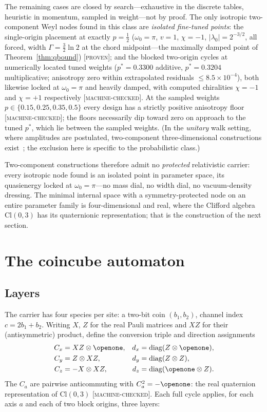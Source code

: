 \documentclass[aps,prd,twocolumn,superscriptaddress,nofootinbib,floatfix]{revtex4-2}
\newcommand{\evP}{\textnormal{\textsc{[proven]}}}
\newcommand{\evM}{\textnormal{\textsc{[machine-checked]}}}
\begin{document}
The remaining cases are closed by search---exhaustive in the discrete
tables, heuristic in momentum, sampled in weight---not by proof.
The only isotropic two-component Weyl nodes found in this class are
\emph{isolated fine-tuned points}: the single-origin placement at
exactly $p=\tfrac12$
($\omega_0=\pi$, $v=1$, $\chi=-1$, $|\lambda_0|=2^{-3/2}$, all forced,
width $\Gamma=\tfrac32\ln2$ at the chord midpoint---the maximally
damped point of Theorem~\ref{thm:qbound}) \evP{}; and the blocked
two-origin cycles at numerically located tuned weights ($p^*=0.3300$
additive, $p^*=0.3204$ multiplicative; anisotropy zero within
extrapolated residuals $\le8.5\times10^{-4}$), both likewise locked at
$\omega_0=\pi$ and heavily damped, with computed chiralities $\chi=-1$
and $\chi=+1$ respectively \evM{}. At the sampled weights
$p\in\{0.15,0.25,0.35,0.5\}$ every design has a strictly positive
anisotropy floor \evM{}; the floors necessarily dip toward zero on
approach to the tuned $p^*$, which lie between the sampled weights.
(In the \emph{unitary} walk setting, where amplitudes are postulated,
two-component three-dimensional constructions
exist~\cite{Chandrashekar,DArianoErba}; the exclusion here is specific
to the probabilistic class.)

Two-component constructions therefore admit no \emph{protected}
relativistic carrier: every isotropic node found is an isolated point in
parameter space, its quasienergy locked at $\omega_0=\pi$---no mass dial,
no width dial, no vacuum-density dressing. The minimal internal space
with a symmetry-protected node on an entire parameter family is
four-dimensional and real, where the Clifford algebra $\mathrm{Cl}(0,3)$
has its quaternionic representation; that is the construction of the next
section.
\section{The coincube automaton}
\label{sec:coincube}

\subsection{Layers}

The carrier has four species per site: a two-bit coin $(b_1,b_2)$, channel
index $c=2b_1+b_2$. Writing $X$, $Z$ for the real Pauli matrices and
$XZ$ for their (antisymmetric) product, define the conversion triple and
direction assignments
\begin{align}
C_x &= XZ\otimes\openone, & d_x &= \mathrm{diag}(Z\otimes\openone),
\nonumber\\
C_y &= Z\otimes XZ, & d_y &= \mathrm{diag}(Z\otimes Z),
\nonumber\\
C_z &= -X\otimes XZ, & d_z &= \mathrm{diag}(\openone\otimes Z).
\label{eq:tables}
\end{align}
The $C_a$ are pairwise anticommuting with $C_a^2=-\openone$: the real
quaternion representation of $\mathrm{Cl}(0,3)$ \evM{}. Each full cycle
applies, for each axis $a$ and each of two block origins, three layers:
\end{document}
